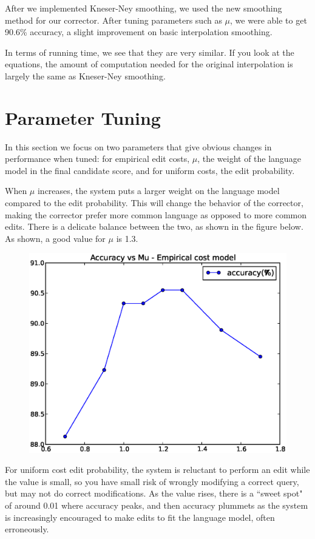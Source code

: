 \documentclass[10pt,twocolumn]{article}
\begin{document}
After we implemented Kneser-Ney smoothing, we used the new smoothing method for our corrector. After tuning parameters such as $\mu$, we were able to get 90.6\% accuracy, a slight improvement on basic interpolation smoothing.

In terms of running time, we see that they are very similar. If you look at the equations, the amount of computation needed for the original interpolation is largely the same as Kneser-Ney smoothing.
\section{Parameter Tuning}
In this section we focus on two parameters that give obvious changes in performance when tuned: for empirical edit costs, $\mu$, the weight of the language model in the final candidate score, and for uniform costs, the edit probability.

When $\mu$ increases, the system puts a larger weight on the language model compared to the edit probability. This will change the behavior of the corrector, making the corrector prefer more common language as opposed to more common edits. There is a delicate balance between the two, as shown in the figure below. As shown, a good value for $\mu$ is 1.3.
\begin{figure}[H]
\includegraphics[width=0.9\linewidth]{mu}
\end{figure}

For uniform cost edit probability, the system is reluctant to perform an edit while the value is small, so you have small risk of wrongly modifying a correct query, but may not do correct modifications. As the value rises, there is a ``sweet spot" of around 0.01 where accuracy peaks, and then accuracy plummets as the system is increasingly encouraged to make edits to fit the language model, often erroneously.
\end{document}
